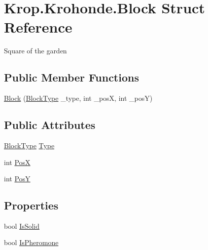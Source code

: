 \hypertarget{struct_krop_1_1_krohonde_1_1_block}{}\section{Krop.\+Krohonde.\+Block Struct Reference}
\label{struct_krop_1_1_krohonde_1_1_block}


Square of the garden  


\subsection*{Public Member Functions}
\begin{DoxyCompactItemize}
\item 
\mbox{\hyperlink{struct_krop_1_1_krohonde_1_1_block_a97282cb31dfc644de1e7330b602c86fe}{Block}} (\mbox{\hyperlink{namespace_krop_1_1_krohonde_ae5fde399eea87be9e3c80744c3d73029}{Block\+Type}} \+\_\+type, int \+\_\+posX, int \+\_\+posY)
\end{DoxyCompactItemize}
\subsection*{Public Attributes}
\begin{DoxyCompactItemize}
\item 
\mbox{\hyperlink{namespace_krop_1_1_krohonde_ae5fde399eea87be9e3c80744c3d73029}{Block\+Type}} \mbox{\hyperlink{struct_krop_1_1_krohonde_1_1_block_ae0536d7f9addc778b31ff9698a3912ea}{Type}}
\item 
int \mbox{\hyperlink{struct_krop_1_1_krohonde_1_1_block_aecb744135f0e31b6cd60dfd49545ac81}{PosX}}
\item 
int \mbox{\hyperlink{struct_krop_1_1_krohonde_1_1_block_a7624f76d57aa904f648ad0083d01d4b6}{PosY}}
\end{DoxyCompactItemize}
\subsection*{Properties}
\begin{DoxyCompactItemize}
\item 
bool \mbox{\hyperlink{struct_krop_1_1_krohonde_1_1_block_a1e8933c939ea3cafbe9e25bdade26de6}{Is\+Solid}}
\item 
bool \mbox{\hyperlink{struct_krop_1_1_krohonde_1_1_block_ada38670f895fb49ce83bdd2e611763ca}{Is\+Pheromone}}
\end{DoxyCompactItemize}


